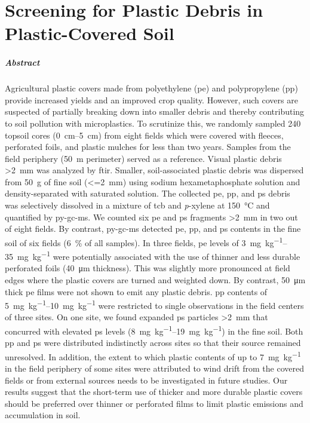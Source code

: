 
\chapter{Screening for Plastic Debris in Plastic-Covered Soil}
\label{ch:screening}

\paragraph{Abstract}
Agricultural plastic covers made from polyethylene (\ac{pe}) and polypropylene (\ac{pp}) provide increased yields and an improved crop quality. However, such covers are suspected of partially breaking down into smaller debris and thereby contributing to soil pollution with microplastics. To scrutinize this, we randomly sampled 240 topsoil cores (\SIrange{0}{5}{\centi\meter}) from eight fields which were covered with fleeces, perforated foils, and plastic mulches for less than two years. Samples from the field periphery (\SI{50}{\meter} perimeter) served as a reference. Visual plastic debris \SI{>2}{\milli\meter} was analyzed by \ac{ftir}. Smaller, soil-associated plastic debris was dispersed from \SI{50}{\gram} of fine soil (\SI{<=2}{\milli\meter}) using sodium hexametaphosphate solution and density-separated with saturated  solution. The collected \ac{pe}, \ac{pp}, and \ac{ps} debris was selectively dissolved in a mixture of \ac{tcb} and \textit{p}-xylene at \SI{150}{\degreeCelsius} and quantified by \ac{py-gc-ms}. We counted six \ac{pe} and \ac{ps} fragments \SI{>2}{\milli\meter} in two out of eight fields. By contrast, \ac{py-gc-ms} detected \ac{pe}, \ac{pp}, and \ac{ps} contents in the fine soil of six fields (\SI{6}{\percent} of all samples). In three fields, \ac{pe} levels of \SIrange{3}{35}{\milli\gram\per\kilo\gram} were potentially associated with the use of thinner and less durable perforated foils (\SI{40}{\micro\meter} thickness). This was slightly more pronounced at field edges where the plastic covers are turned and weighted down. By contrast, \SI{50}{\micro\meter} thick \ac{pe} films were not shown to emit any plastic debris. \ac{pp} contents of \SIrange{5}{10}{\milli\gram\per\kilo\gram} were restricted to single observations in the field centers of three sites. On one site, we found expanded \ac{ps} particles \SI{>2}{\milli\meter} that concurred with elevated \ac{ps} levels (\SIrange{8}{19}{\milli\gram\per\kilo\gram}) in the fine soil. Both \ac{pp} and \ac{ps} were distributed indistinctly across sites so that their source remained unresolved. In addition, the extent to which plastic contents of up to \SI{7}{\milli\gram\per\kilo\gram} in the field periphery of some sites were attributed to wind drift from the covered fields or from external sources needs to be investigated in future studies. Our results suggest that the short-term use of thicker and more durable plastic covers should be preferred over thinner or perforated films to limit plastic emissions and accumulation in soil.

